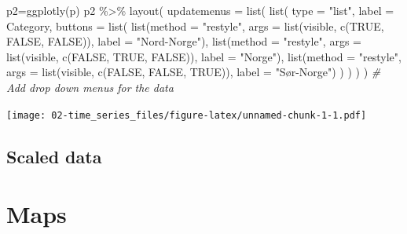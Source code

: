 \documentclass[
]{book}
\newenvironment{Shaded}{\begin{snugshade}}{\end{snugshade}}
\newcommand{\AttributeTok}[1]{\textcolor[rgb]{0.77,0.63,0.00}{#1}}
\newcommand{\CommentTok}[1]{\textcolor[rgb]{0.56,0.35,0.01}{\textit{#1}}}
\newcommand{\ConstantTok}[1]{\textcolor[rgb]{0.00,0.00,0.00}{#1}}
\newcommand{\FunctionTok}[1]{\textcolor[rgb]{0.00,0.00,0.00}{#1}}
\newcommand{\NormalTok}[1]{#1}
\newcommand{\OtherTok}[1]{\textcolor[rgb]{0.56,0.35,0.01}{#1}}
\newcommand{\SpecialCharTok}[1]{\textcolor[rgb]{0.00,0.00,0.00}{#1}}
\newcommand{\StringTok}[1]{\textcolor[rgb]{0.31,0.60,0.02}{#1}}
\begin{document}
\begin{Shaded}
\begin{Highlighting}[]
\NormalTok{p2}\OtherTok{=}\FunctionTok{ggplotly}\NormalTok{(p)}
\NormalTok{p2 }\SpecialCharTok{\%\textgreater{}\%} \FunctionTok{layout}\NormalTok{(}
  \AttributeTok{updatemenus =} \FunctionTok{list}\NormalTok{(}
    \FunctionTok{list}\NormalTok{(}
      \AttributeTok{type =} \StringTok{"list"}\NormalTok{,}
      \AttributeTok{label =} \StringTok{\textquotesingle{}Category\textquotesingle{}}\NormalTok{,}
      \AttributeTok{buttons =} \FunctionTok{list}\NormalTok{(}
        \FunctionTok{list}\NormalTok{(}\AttributeTok{method =} \StringTok{"restyle"}\NormalTok{,}
             \AttributeTok{args =} \FunctionTok{list}\NormalTok{(}\StringTok{\textquotesingle{}visible\textquotesingle{}}\NormalTok{, }\FunctionTok{c}\NormalTok{(}\ConstantTok{TRUE}\NormalTok{, }\ConstantTok{FALSE}\NormalTok{, }\ConstantTok{FALSE}\NormalTok{)),}
             \AttributeTok{label =} \StringTok{"Nord{-}Norge"}\NormalTok{),}
        \FunctionTok{list}\NormalTok{(}\AttributeTok{method =} \StringTok{"restyle"}\NormalTok{,}
             \AttributeTok{args =} \FunctionTok{list}\NormalTok{(}\StringTok{\textquotesingle{}visible\textquotesingle{}}\NormalTok{, }\FunctionTok{c}\NormalTok{(}\ConstantTok{FALSE}\NormalTok{, }\ConstantTok{TRUE}\NormalTok{, }\ConstantTok{FALSE}\NormalTok{)),}
             \AttributeTok{label =} \StringTok{"Norge"}\NormalTok{),}
        \FunctionTok{list}\NormalTok{(}\AttributeTok{method =} \StringTok{"restyle"}\NormalTok{,}
             \AttributeTok{args =} \FunctionTok{list}\NormalTok{(}\StringTok{\textquotesingle{}visible\textquotesingle{}}\NormalTok{, }\FunctionTok{c}\NormalTok{(}\ConstantTok{FALSE}\NormalTok{, }\ConstantTok{FALSE}\NormalTok{, }\ConstantTok{TRUE}\NormalTok{)),}
             \AttributeTok{label =} \StringTok{"Sør{-}Norge"}\NormalTok{)}
\NormalTok{      )}
\NormalTok{    )}
\NormalTok{  )}
\NormalTok{) }\CommentTok{\# Add drop down menus for the data}
\end{Highlighting}
\end{Shaded}

\texttt{[image: 02-time\_series\_files/figure-latex/unnamed-chunk-1-1.pdf]}

\hypertarget{scaled-data}{%
\section{Scaled data}\label{scaled-data}}

\hypertarget{maps}{%
\chapter{Maps}\label{maps}}
\end{document}
